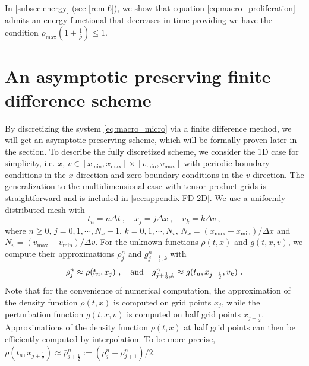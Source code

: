 \documentclass[review,onefignum,onetabnum]{siamart220329}
\newcommand {\dx}   {\Delta x}
\begin{document}
{In \cref{subsec:energy} (see \cref{rem 6}), we show that equation \cref{eq:macro_proliferation} admits an energy functional that decreases in time providing we have the condition $\rho_{\max} (1 + \frac{1}{\bar{\rho}}) \leq 1$}. 

\section{An asymptotic preserving finite difference scheme}\label{sec: implicit-explicit scheme}
By discretizing the system  \cref{eq:macro_micro} via a finite difference method, we will get an asymptotic preserving scheme, which will be formally proven later in the section. 
To describe the fully discretized scheme, we consider the 1D case for simplicity, i.e. {$x, \,v \in [x_{\min}, x_{\max}]\times [v_{\min}, v_{\max}]$ with periodic boundary conditions in the $x$-direction and zero boundary conditions in the $v$-direction.} The generalization to
the multidimensional case with tensor product grids is straightforward and is included in  \cref{sec:appendix-FD-2D}. We use a uniformly distributed mesh with 
\begin{equation*}
    t_n = n \Delta t\ , \quad x_j = j \dx\ , \quad v_k = k \Delta v\  ,
\end{equation*}
where $n\ge0$, $j=0,1,\cdots, N_x-1$, $k=0,1,\cdots, N_v$, $N_x = (x_{\max} - x_{\min}) / \Delta x$ and $N_v = (v_{\max} - v_{\min}) / \Delta v$. 
For the unknown functions $\rho(t,x)$ and $g(t,x,v)$, we compute {{their}} approximations $\rho_j^n$ and $g^n_{j+\frac{1}{2},k}$ with 
\begin{equation*}
  \rho_j^n\approx\rho(t_n,x_j)\ ,\quad\textnormal{and} \quad  
  g^n_{j+\frac{1}{2},k}\approx g(t_n,x_{j+\frac{1}{2}},v_k)\ . 
\end{equation*}
Note that for the convenience of numerical computation, the approximation of the density function $\rho(t,x)$ is computed on grid points $x_j$, while the perturbation function $g(t,x,v)$ is computed on half grid points $x_{j+\frac12}$. 
Approximations of the density function $\rho(t,x)$ at half grid points can then be  efficiently computed by interpolation. 
To be more precise,  $\rho(t_n,x_{j+\frac12}) \approx \bar{\rho}_{j+\frac12}^n:=(\rho_j^n + \rho_{j+1}^n)/2$. 
\end{document}
